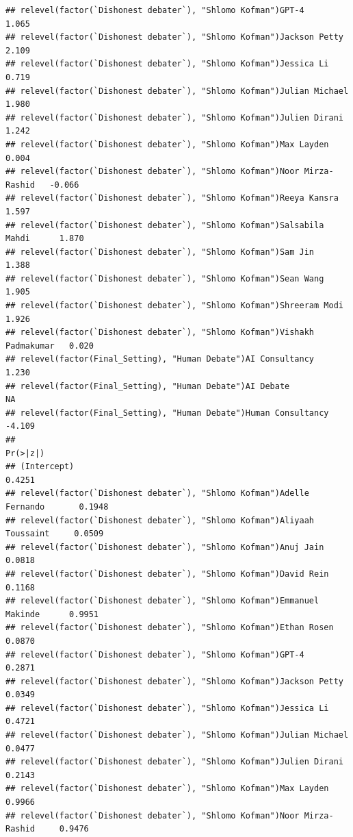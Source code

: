\documentclass[
]{article}
\begin{document}
\begin{verbatim}
## relevel(factor(`Dishonest debater`), "Shlomo Kofman")GPT-4                1.065
## relevel(factor(`Dishonest debater`), "Shlomo Kofman")Jackson Petty        2.109
## relevel(factor(`Dishonest debater`), "Shlomo Kofman")Jessica Li           0.719
## relevel(factor(`Dishonest debater`), "Shlomo Kofman")Julian Michael       1.980
## relevel(factor(`Dishonest debater`), "Shlomo Kofman")Julien Dirani        1.242
## relevel(factor(`Dishonest debater`), "Shlomo Kofman")Max Layden           0.004
## relevel(factor(`Dishonest debater`), "Shlomo Kofman")Noor Mirza-Rashid   -0.066
## relevel(factor(`Dishonest debater`), "Shlomo Kofman")Reeya Kansra         1.597
## relevel(factor(`Dishonest debater`), "Shlomo Kofman")Salsabila Mahdi      1.870
## relevel(factor(`Dishonest debater`), "Shlomo Kofman")Sam Jin              1.388
## relevel(factor(`Dishonest debater`), "Shlomo Kofman")Sean Wang            1.905
## relevel(factor(`Dishonest debater`), "Shlomo Kofman")Shreeram Modi        1.926
## relevel(factor(`Dishonest debater`), "Shlomo Kofman")Vishakh Padmakumar   0.020
## relevel(factor(Final_Setting), "Human Debate")AI Consultancy              1.230
## relevel(factor(Final_Setting), "Human Debate")AI Debate                      NA
## relevel(factor(Final_Setting), "Human Debate")Human Consultancy          -4.109
##                                                                          Pr(>|z|)
## (Intercept)                                                                0.4251
## relevel(factor(`Dishonest debater`), "Shlomo Kofman")Adelle Fernando       0.1948
## relevel(factor(`Dishonest debater`), "Shlomo Kofman")Aliyaah Toussaint     0.0509
## relevel(factor(`Dishonest debater`), "Shlomo Kofman")Anuj Jain             0.0818
## relevel(factor(`Dishonest debater`), "Shlomo Kofman")David Rein            0.1168
## relevel(factor(`Dishonest debater`), "Shlomo Kofman")Emmanuel Makinde      0.9951
## relevel(factor(`Dishonest debater`), "Shlomo Kofman")Ethan Rosen           0.0870
## relevel(factor(`Dishonest debater`), "Shlomo Kofman")GPT-4                 0.2871
## relevel(factor(`Dishonest debater`), "Shlomo Kofman")Jackson Petty         0.0349
## relevel(factor(`Dishonest debater`), "Shlomo Kofman")Jessica Li            0.4721
## relevel(factor(`Dishonest debater`), "Shlomo Kofman")Julian Michael        0.0477
## relevel(factor(`Dishonest debater`), "Shlomo Kofman")Julien Dirani         0.2143
## relevel(factor(`Dishonest debater`), "Shlomo Kofman")Max Layden            0.9966
## relevel(factor(`Dishonest debater`), "Shlomo Kofman")Noor Mirza-Rashid     0.9476

\end{verbatim}
\end{document}
